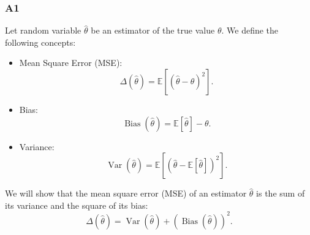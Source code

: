 \subsubsection{A1} \label{app1}

Let random variable $\hat{\theta}$ be an estimator of the true value $\theta$. We define the following concepts:
\begin{itemize}
    \item Mean Square Error (MSE):
\begin{equation}
    \Delta(\hat{\theta}) = \mathbb{E}\left[(\hat{\theta} - \theta)^2\right].
\end{equation}
    \item Bias:
\begin{equation}
    \operatorname{Bias}(\hat{\theta}) = \mathbb{E}[\hat{\theta}] - \theta.
\end{equation}
    \item Variance:
\begin{equation}
    \operatorname{Var}(\hat{\theta}) = \mathbb{E}[(\hat{\theta} - \mathbb{E}[\hat{\theta}])^2].
\end{equation}
\end{itemize}
\begin{lemma}
    We will show that the mean square error (MSE) of an estimator $\hat{\theta}$ is the sum of its variance and the square of its bias:
\begin{equation}
    \Delta(\hat{\theta}) = \operatorname{Var}(\hat{\theta}) + (\operatorname{Bias}(\hat{\theta}))^2.
\end{equation}
\end{lemma}

